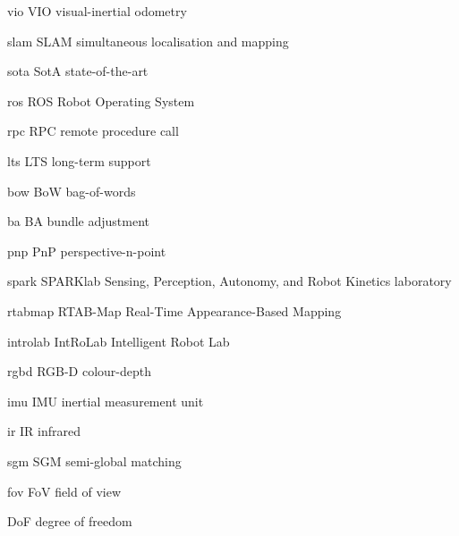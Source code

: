 \newacronym
    {vio}
    {VIO}
    {visual-inertial odometry}

\newacronym
    {slam}
    {SLAM}
    {simultaneous localisation and mapping}

\newacronym
    {sota}
    {SotA}
    {state-of-the-art}

\newacronym
    {ros}
    {ROS}
    {Robot Operating System}

\newacronym
    {rpc}
    {RPC}
    {remote procedure call}

\newacronym
    {lts}
    {LTS}
    {long-term support}

\newacronym
    {bow}
    {BoW}
    {bag-of-words}

\newacronym
    {ba}
    {BA}
    {bundle adjustment}

\newacronym
    {pnp}
    {PnP}
    {perspective-n-point}

\newacronym
    {spark}
    {SPARKlab}
    {Sensing, Perception, Autonomy, and Robot Kinetics laboratory}

\newacronym
    {rtabmap}
    {RTAB-Map}
    {Real-Time Appearance-Based Mapping}

\newacronym
    {introlab}
    {IntRoLab}
    {Intelligent Robot Lab}

\newacronym
    {rgbd}
    {RGB-D}
    {colour-depth}

\newacronym
    {imu}
    {IMU}
    {inertial measurement unit}

\newacronym
    {ir}
    {IR}
    {infrared}

\newacronym
    {sgm}
    {SGM}
    {semi-global matching}

\newacronym
    {fov}
    {FoV}
    {field of view}

    {DoF}
    {degree of freedom}

